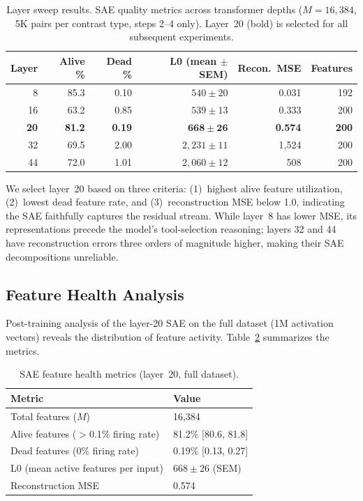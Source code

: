\documentclass[runningheads]{llncs}
\begin{document}
\begin{table}[t]
\caption{Layer sweep results. SAE quality metrics across transformer depths ($M = 16{,}384$, 5K pairs per contrast type, steps 2--4 only). Layer~20 (bold) is selected for all subsequent experiments.}
\label{tab:layer_sweep}
\centering
\begin{tabular}{rrrrrr}
\toprule
Layer & Alive \% & Dead \% & L0 (mean $\pm$ SEM) & Recon.\ MSE & Features \\
\midrule
8  & 85.3 & 0.10 & $540 \pm 20$   & 0.031   & 192 \\
16 & 63.2 & 0.85 & $539 \pm 13$   & 0.333   & 200 \\
\textbf{20} & \textbf{81.2} & \textbf{0.19} & $\mathbf{668 \pm 26}$ & \textbf{0.574} & \textbf{200} \\
32 & 69.5 & 2.00 & $2{,}231 \pm 11$ & 1{,}524 & 200 \\
44 & 72.0 & 1.01 & $2{,}060 \pm 12$ & 508     & 200 \\
\bottomrule
\end{tabular}
\end{table}

We select layer~20 based on three criteria: (1)~highest alive feature utilization, (2)~lowest dead feature rate, and (3)~reconstruction MSE below 1.0, indicating the SAE faithfully captures the residual stream. While layer~8 has lower MSE, its representations precede the model's tool-selection reasoning; layers 32 and 44 have reconstruction errors three orders of magnitude higher, making their SAE decompositions unreliable.

\subsection{Feature Health Analysis}

Post-training analysis of the layer-20 SAE on the full dataset (1M activation vectors) reveals the distribution of feature activity. Table~\ref{tab:health} summarizes the metrics.

\begin{table}[t]
\caption{SAE feature health metrics (layer~20, full dataset).}
\label{tab:health}
\centering
\begin{tabular}{ll}
\toprule
Metric & Value \\
\midrule
Total features ($M$) & 16,384 \\
Alive features ($>$0.1\% firing rate) & 81.2\% [80.6, 81.8] \\
Dead features (0\% firing rate) & 0.19\% [0.13, 0.27] \\
L0 (mean active features per input) & $668 \pm 26$ (SEM) \\
Reconstruction MSE & 0.574 \\
\bottomrule
\end{tabular}
\end{table}
\end{document}
